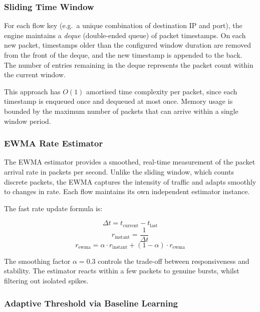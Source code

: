 \documentclass[12pt,a4paper]{article}
\begin{document}
\subsubsection{Sliding Time Window}

For each flow key (e.g.\ a unique combination of destination IP and port), the engine maintains a \emph{deque} (double-ended queue) of packet timestamps. On each new packet, timestamps older than the configured window duration are removed from the front of the deque, and the new timestamp is appended to the back. The number of entries remaining in the deque represents the packet count within the current window.

This approach has $O(1)$ amortised time complexity per packet, since each timestamp is enqueued once and dequeued at most once. Memory usage is bounded by the maximum number of packets that can arrive within a single window period.

\subsubsection{EWMA Rate Estimator}

The EWMA estimator provides a smoothed, real-time measurement of the packet arrival rate in packets per second. Unlike the sliding window, which counts discrete packets, the EWMA captures the intensity of traffic and adapts smoothly to changes in rate. Each flow maintains its own independent estimator instance.

The fast rate update formula is:

\begin{equation}
    \Delta t = t_{\text{current}} - t_{\text{last}}
\end{equation}
\begin{equation}
    r_{\text{instant}} = \frac{1}{\Delta t}
\end{equation}
\begin{equation}
    r_{\text{ewma}} = \alpha \cdot r_{\text{instant}} + (1 - \alpha) \cdot r_{\text{ewma}}
\label{eq:ewma}
\end{equation}

The smoothing factor $\alpha = 0.3$ controls the trade-off between responsiveness and stability. The estimator reacts within a few packets to genuine bursts, whilst filtering out isolated spikes.

\subsubsection{Adaptive Threshold via Baseline Learning}
\end{document}
